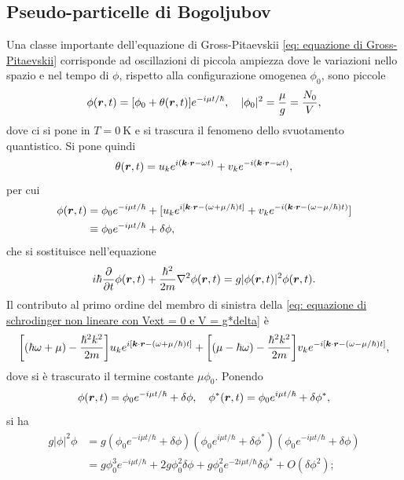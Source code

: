 \subsection{Pseudo-particelle di Bogoljubov}
Una classe importante dell'equazione di Gross-Pitaevskii \eqref{eq: equazione di Gross-Pitaevskii} corrisponde ad oscillazioni di piccola ampiezza dove le variazioni nello spazio e nel tempo di $\phi$, rispetto alla configurazione omogenea $\phi_0$, sono piccole
\begin{equation}
    \phi(\bm{r},t) = [\phi_0 + \theta(\bm{r},t)]e^{-i\mu t/\hbar},\quad |\phi_0|^2 = \frac{\mu}{g} = \frac{N_0}{V},
\end{equation}
dove ci si pone in $T = \SI{0}{\kelvin}$ e si trascura il fenomeno dello svuotamento quantistico. Si pone quindi
\begin{equation}
    \theta(\bm{r},t) = u_ke^{i(\bm{k}\cdot\bm{r} - \omega t)} + v_ke^{-i(\bm{k}\cdot\bm{r} - \omega t)},
\end{equation}
per cui 
\begin{equation}
    \begin{split}
        \phi(\bm{r},t) &= \phi_0e^{-i\mu t/\hbar} + [u_ke^{i[\bm{k}\cdot\bm{r} - (\omega + \mu/\hbar) t]} + v_ke^{-i(\bm{k}\cdot\bm{r} - (\omega - \mu/\hbar) t)}] \\
        &\equiv \phi_0e^{-i\mu t/\hbar} + \delta\phi,
    \end{split}
\end{equation}
che si sostituisce nell'equazione
\begin{equation}
\label{eq: equazione di schrodinger non lineare con Vext = 0 e V = g*delta}
    i\hbar\frac{\partial}{\partial t}\phi(\bm{r},t) + \frac{\hbar^2}{2m}\nabla^2\phi(\bm{r},t) = g|\phi(\bm{r},t)|^2\phi(\bm{r},t).
\end{equation}
Il contributo al primo ordine del membro di sinistra della \eqref{eq: equazione di schrodinger non lineare con Vext = 0 e V = g*delta} è
\begin{equation}
    \bigg[(\hbar\omega + \mu) - \frac{\hbar^2k^2}{2m}\bigg]u_ke^{i[\bm{k}\cdot\bm{r} - (\omega + \mu/\hbar)t]} + \bigg[(\mu - \hbar\omega) - \frac{\hbar^2k^2}{2m}\bigg]v_ke^{-i[\bm{k}\cdot\bm{r} - (\omega - \mu/\hbar)t]},
\end{equation}
dove si è trascurato il termine costante $\mu\phi_0$. Ponendo
\begin{equation}
    \phi(\bm{r},t) = \phi_0e^{-i\mu t/\hbar} + \delta\phi,\quad \phi^*(\bm{r},t) = \phi_0e^{i\mu t/\hbar} + \delta\phi^*,
\end{equation}
si ha
\begin{equation}
    \begin{split}
        g|\phi|^2\phi &= g(\phi_0e^{-i\mu t/\hbar} + \delta\phi)(\phi_0e^{i\mu t/\hbar} + \delta\phi^*)(\phi_0e^{-i\mu t/\hbar} + \delta\phi) \\
        &= g\phi_0^3e^{-i\mu t/\hbar} + 2g\phi_0^2\delta\phi + g\phi_0^2e^{-2i\mu t/\hbar}\delta\phi^* + O(\delta\phi^2);
    \end{split}
\end{equation}
